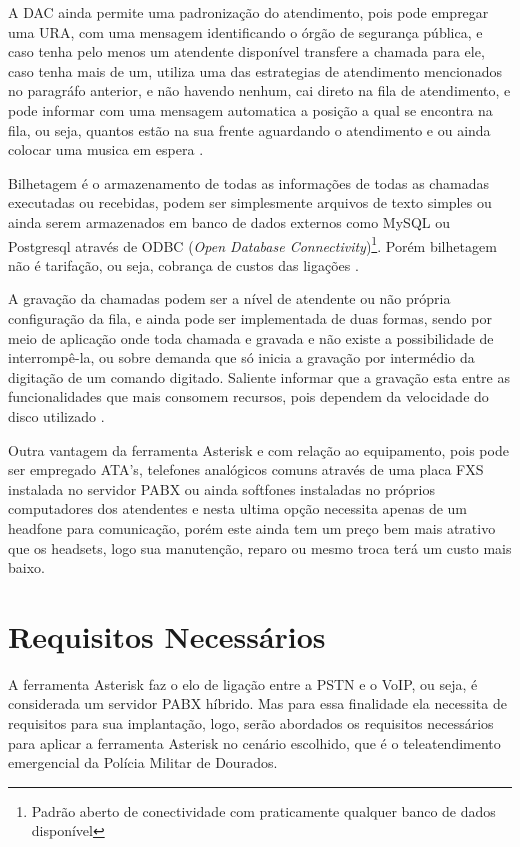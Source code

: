 A DAC ainda permite uma padronização do atendimento, pois pode empregar uma URA, com uma mensagem identificando o órgão de segurança pública, e caso tenha pelo menos um atendente disponível transfere a chamada para ele, caso tenha mais de um, utiliza uma das estrategias de atendimento mencionados no paragráfo anterior, e não havendo nenhum, cai direto na fila de atendimento, e pode informar com uma mensagem automatica a posição a qual se encontra na fila, ou seja, quantos estão na sua frente aguardando o atendimento e ou ainda colocar uma musica em espera \cite{flavioeduardoandredade2005}.

Bilhetagem é o armazenamento de todas as informações de todas as chamadas executadas ou recebidas, podem ser simplesmente arquivos de texto simples ou ainda serem armazenados em banco de dados externos como MySQL ou Postgresql através de ODBC (\textit{Open Database Connectivity})\footnote{Padrão aberto de conectividade com praticamente qualquer banco de dados disponível}. Porém bilhetagem não é tarifação, ou seja, cobrança de custos das ligações \cite{alexandrekeller2014}.

A gravação da chamadas podem ser a nível de atendente ou não própria configuração da fila, e ainda pode ser implementada de duas formas, sendo por meio de aplicação onde toda chamada e gravada e não existe a possibilidade de interrompê-la, ou sobre demanda que só inicia a gravação por intermédio da digitação de um comando digitado. Saliente informar que a gravação esta entre as funcionalidades que mais consomem recursos, pois dependem da velocidade do disco utilizado \cite{alexandrekeller2014}.

Outra vantagem da ferramenta Asterisk e com relação ao equipamento, pois pode ser empregado ATA's, telefones analógicos comuns através de uma placa FXS instalada no servidor PABX ou ainda softfones instaladas no próprios computadores dos atendentes e nesta ultima opção necessita apenas de um headfone para comunicação, porém este ainda tem um preço bem mais atrativo que os headsets, logo sua manutenção, reparo ou mesmo troca terá um custo mais baixo.

\section{Requisitos Necessários}
A ferramenta Asterisk faz o elo de ligação entre a PSTN e o VoIP, ou seja, é considerada um servidor PABX híbrido. Mas para essa finalidade ela necessita de requisitos para sua implantação, logo, serão abordados os requisitos necessários para aplicar a ferramenta Asterisk no cenário escolhido, que é o teleatendimento emergencial da Polícia Militar de Dourados.

